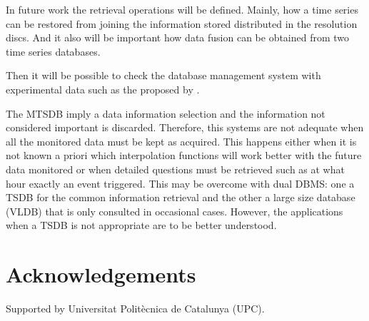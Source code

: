 In future work the retrieval operations will be defined. Mainly, how a
time series can be restored from joining the information stored
distributed in the resolution discs. And it also will be important
how data fusion can be obtained from two time series databases.

Then it will be possible to check the database management system with
experimental data such as the proposed by \cite{keogh02}.

The MTSDB imply a data information selection and the information not considered important is discarded.  Therefore, this systems are not adequate when all the monitored data must be kept as acquired. This happens either when it is not known a priori which interpolation functions will work better with the future data monitored or when detailed questions must be retrieved such as at what hour exactly an event triggered. This may be overcome with dual DBMS: one a TSDB for the common information retrieval and the other a large size database (VLDB) that is only consulted in occasional cases. 
However, the applications when a TSDB is not appropriate are to be better understood. 

          
\section{Acknowledgements}

Supported by Universitat Politècnica de Catalunya (UPC).

